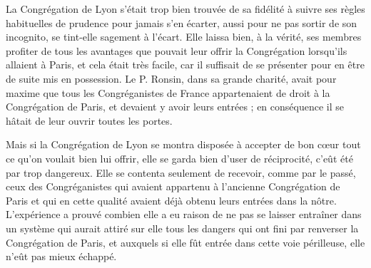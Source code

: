La Congrégation de Lyon s'était trop bien trouvée de sa fidélité à suivre ses règles habituelles de prudence pour jamais s'en écarter, aussi pour ne pas sortir de son incognito, se tint-elle sagement à l'écart. Elle laissa bien, à la vérité, ses membres profiter de tous les avantages que pouvait leur offrir la Congrégation lorsqu'ils allaient à Paris, et cela était très facile, car il suffisait de se présenter pour en être de suite mis en possession. Le P. Ronsin, dans sa grande charité, avait pour maxime que tous les Congréganistes de France appartenaient de droit à la Congrégation de Paris, et devaient y avoir leurs entrées ; en conséquence il se hâtait de leur ouvrir toutes les portes.

Mais si la Congrégation de Lyon se montra disposée à accepter de bon cœur tout ce qu'on voulait bien lui offrir, elle se garda bien d'user de réciprocité, c'eût été par trop dangereux. Elle se contenta seulement de recevoir, comme par le passé, ceux des Congréganistes qui avaient appartenu à l'ancienne Congrégation de Paris et qui en cette qualité avaient déjà obtenu leurs entrées dans la nôtre. L'expérience a prouvé combien elle a eu raison de ne pas se laisser entraîner dans un système qui aurait
attiré sur elle tous les dangers qui ont fini par renverser la Congrégation de Paris, et auxquels si elle fût entrée dans cette voie périlleuse, elle n'eût pas mieux échappé.

